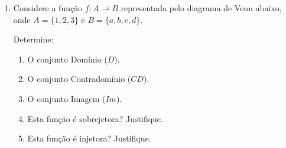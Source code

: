 \documentclass[12pt]{article}
\begin{document}
\begin{enumerate}[label=\arabic*), leftmargin=1.5cm, itemsep=0.5cm]
    \begin{solucao}
        \begin{itemize}
            \item \textbf{Gráfico A (Parábola):} (I) Função; (II) Não-injetora.
            \item \textbf{Gráfico B (Parábola lateral):} (I) Não-função (reta vertical toca em dois pontos).
            \item \textbf{Gráfico C (Reta inclinada):} (I) Função; (II) Injetora.
            \item \textbf{Gráfico D (Cúbica):} (I) Função; (II) Injetora.
            \item \textbf{Gráfico E (Círculo):} (I) Não-função.
            \item \textbf{Gráfico F (Reta horizontal):} (I) Função; (II) Não-injetora.
            \item \textbf{Gráfico G (Senoide):} (I) Função; (II) Não-injetora.
            \item \textbf{Gráfico H (Valor Absoluto):} (I) Função; (II) Não-injetora.
            \item \textbf{Gráfico I (Semicírculo):} (I) Função; (II) Não-injetora.
            \item \textbf{Gráfico J (Exponencial):} (I) Função; (II) Injetora.
            \item \textbf{Gráfico K (Logaritmo):} (I) Função; (II) Injetora.
        \end{itemize}
    \end{solucao}

    \item Considere a função $f: A \to B$ representada pelo diagrama de Venn abaixo, onde $A = \{1, 2, 3\}$ e $B = \{a, b, c, d\}$.
    
    Determine:
    \begin{enumerate}[label=\alph*)]
        \item O conjunto Domínio ($D$).
        \item O conjunto Contradomínio ($CD$).
        \item O conjunto Imagem ($Im$).
        \item Esta função é sobrejetora? Justifique.
        \item Esta função é injetora? Justifique.
    \end{enumerate}


\end{enumerate}
\end{document}
